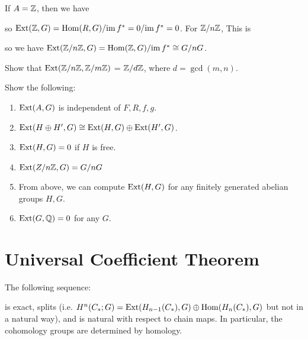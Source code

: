 \begin{example}
  If $A = \mathbb{Z}$, then we have
  \begin{center}
  \end{center}
  so $\operatorname{Ext}(\mathbb{Z}, G) = \operatorname{Hom}(R, G) / {\operatorname{im} f^*} = 0 / {\operatorname{im} f^*} = 0$.
  For $\mathbb{Z} / n\mathbb{Z}$, This is
  \begin{center}
  \end{center}
  so we have $\operatorname{Ext}(\mathbb{Z} / n\mathbb{Z}, G) = \operatorname{Hom}(\mathbb{Z}, G) / {\operatorname{im} f^*} \cong G / n G$.
\end{example}

\begin{exercise}
  Show that $\operatorname{Ext}(\mathbb{Z} / n\mathbb{Z}, \mathbb{Z} / m\mathbb{Z})$ =
  $\mathbb{Z} / d \mathbb{Z}$, where $d = \gcd(m, n)$.
\end{exercise}

\begin{exercise}
  Show the following:
  \begin{enumerate}
    \item $\operatorname{Ext}(A, G)$ is independent of $F, R, f, g$.
    \item $\operatorname{Ext}(H \oplus H', G) \cong \operatorname{Ext}(H, G) \oplus \operatorname{Ext}(H', G)$.
    \item $\operatorname{Ext}(H, G) = 0$ if $H$ is free.
    \item $\operatorname{Ext}(Z / n\mathbb{Z}, G) = G / nG$
    \item From above, we can compute
      $\operatorname{Ext}(H, G)$ for any finitely generated
      abelian groups $H, G$.
    \item $\operatorname{Ext}(G, \mathbb{Q}) = 0$ for any $G$.
  \end{enumerate}
\end{exercise}

\section{Universal Coefficient Theorem}

\begin{theorem}
  The following sequence:
  \begin{center}
  \end{center}
  is exact, splits (i.e.
  $H^n(C_*; G) = \operatorname{Ext}(H_{n - 1}(C_*), G) \oplus \operatorname{Hom}(H_n(C_*), G)$ but not in a natural way), and is
  natural with respect
  to chain maps. In particular, the
  cohomology groups are determined by homology.
\end{theorem}

